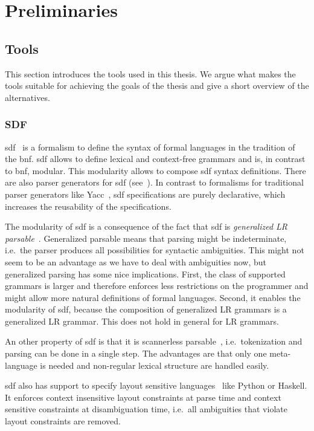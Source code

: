 \chapter{Preliminaries}
\section{Tools}
This section introduces the tools used in this thesis. We argue what
makes the tools suitable for achieving the goals of the thesis and
give a short overview of the alternatives.

\subsection{SDF}
\gls{sdf}~\cite{Heering:1989:SDF:71605.71607} is a formalism to define
the syntax of formal languages in the tradition of the
\gls{bnf}. \gls{sdf} allows to define lexical and context-free
grammars and is, in contrast to \gls{bnf}, modular. This modularity
allows to compose \gls{sdf} syntax definitions. There are also parser
generators for \gls{sdf} (see~\cite{Rekers92parsergeneration}). In
contrast to formalisms for traditional parser generators like
Yacc~\cite{Johnson75yacc:yet}, \gls{sdf} specifications are purely
declarative, which increases the reusability of the specifications.

The modularity of \gls{sdf} is a consequence of the fact that
\gls{sdf} is \textit{generalized LR
  parsable}~\cite{Rekers92parsergeneration}. Generalized parsable
means that parsing might be indeterminate, i.e.\ the parser produces
all possibilities for syntactic ambiguities. This might not seem to be
an advantage as we have to deal with ambiguities now, but generalized
parsing has some nice implications. First, the class of supported
grammars is larger and therefore enforces less restrictions on the
programmer and might allow more natural definitions of formal
languages. Second, it enables the modularity of \gls{sdf}, because the
composition of generalized LR grammars is a generalized LR
grammar. This does not hold in general for LR grammars.

An other property of \gls{sdf} is that it is scannerless
parsable~\cite{Brand02disambiguationfilters}, i.e.\ tokenization and
parsing can be done in a single step. The advantages are that only one
meta-language is needed and non-regular lexical structure are handled
easily.

\gls{sdf} also has support to specify layout sensitive
languages~\cite{conf/sle/ErdwegRKO12} like Python or Haskell. It
enforces context insensitive layout constraints at parse time and
context sensitive constraints at disambiguation time, i.e.\ all
ambiguities that violate layout constraints are removed.

